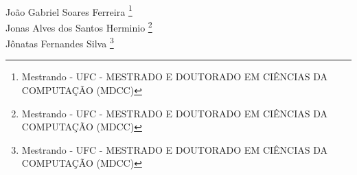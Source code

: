\begin{center}
    \textbf{\MakeUppercase{\imprimirtitulo}} \\
\end{center}


\raggedright

João Gabriel Soares Ferreira
\footnote{
  Mestrando - UFC - MESTRADO E DOUTORADO EM CIÊNCIAS DA COMPUTAÇÃO (MDCC)
} \\ 

Jonas Alves dos Santos Herminio
\footnote{
  Mestrando - UFC - MESTRADO E DOUTORADO EM CIÊNCIAS DA COMPUTAÇÃO (MDCC)
} \\ 

Jônatas Fernandes Silva
\footnote{
  Mestrando - UFC - MESTRADO E DOUTORADO EM CIÊNCIAS DA COMPUTAÇÃO (MDCC)
} \\ 

